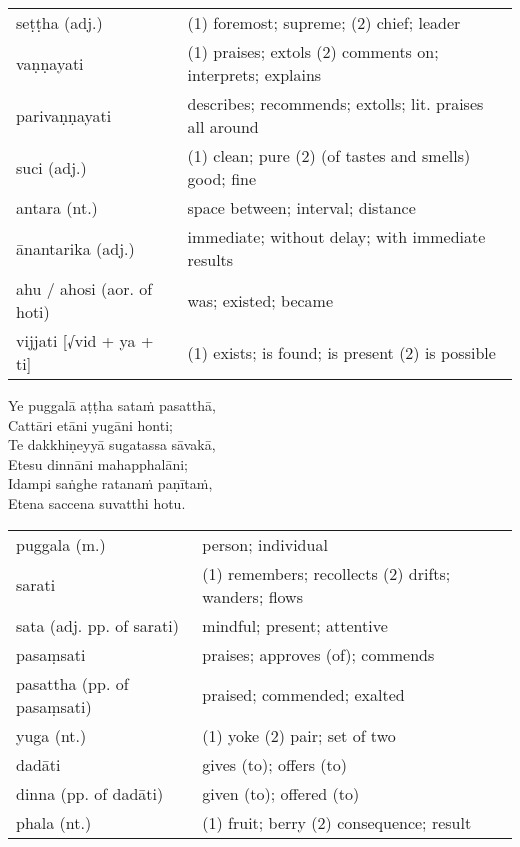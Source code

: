 \documentclass[11pt,oneside]{memoir}
\begin{document}
\begin{longtable}{L{\colOne} L{\colTwo}}
seṭṭha (adj.) & (1) foremost; supreme; (2) chief; leader\\[0pt]
vaṇṇayati & (1) praises; extols (2) comments on; interprets; explains\\[0pt]
parivaṇṇayati & describes; recommends; extolls; lit. praises all around\\[0pt]
suci (adj.) & (1) clean; pure (2) (of tastes and smells) good; fine\\[0pt]
antara (nt.) & space between; interval; distance\\[0pt]
ānantarika (adj.) & immediate; without delay; with immediate results\\[0pt]
ahu / ahosi (aor. of hoti) & was; existed; became\\[0pt]
vijjati [√vid + ya + ti] & (1) exists; is found; is present (2) is possible\\[0pt]
\end{longtable}

\begin{spacedquote}
Ye puggalā aṭṭha sataṁ pasatthā, \\[0pt]
Cattāri etāni yugāni honti; \\[0pt]
Te dakkhiṇeyyā sugatassa sāvakā, \\[0pt]
Etesu dinnāni mahapphalāni; \\[0pt]
Idampi saṅghe ratanaṁ paṇītaṁ, \\[0pt]
Etena saccena suvatthi hotu.
\end{spacedquote}

\begin{longtable}{L{\colOne} L{\colTwo}}
puggala (m.) & person; individual\\[0pt]
sarati & (1) remembers; recollects (2) drifts; wanders; flows\\[0pt]
sata (adj. pp. of sarati) & mindful; present; attentive\\[0pt]
pasaṃsati & praises; approves (of); commends\\[0pt]
pasattha (pp. of pasaṃsati) & praised; commended; exalted\\[0pt]
yuga (nt.) & (1) yoke (2) pair; set of two\\[0pt]
dadāti & gives (to); offers (to)\\[0pt]
dinna (pp. of dadāti) & given (to); offered (to)\\[0pt]
phala (nt.) & (1) fruit; berry (2) consequence; result\\[0pt]
\end{longtable}
\end{document}
